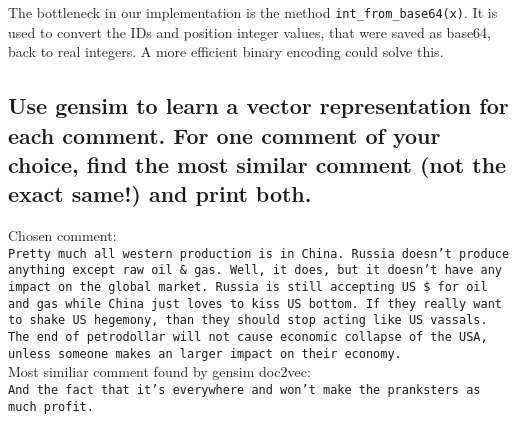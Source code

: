 \documentclass{scrartcl}
\begin{document}
The bottleneck in our implementation is the method \texttt{int\_from\_base64(x)}. It is used to convert the IDs and position integer values, that were saved as base64, back to real integers. A more efficient binary encoding could solve this.

\subsection{Use gensim to learn a vector representation for each comment. For one comment of your choice, find the most similar comment (not the exact same!) and print both.}

Chosen comment:\\

\texttt{Pretty much all western production is in China. Russia doesn't produce anything except raw oil \& gas. Well, it does, but it doesn't have any impact on the global market. Russia is still accepting US \$ for oil and gas while China just loves to kiss US bottom. If they really want to shake US hegemony, than they should stop acting like US vassals. The end of petrodollar will not cause economic collapse of the USA, unless someone makes an larger impact on their economy.}\\

Most similiar comment found by gensim doc2vec:\\

\texttt{And the fact that it's everywhere and won't make the pranksters as much profit.}
\end{document}
